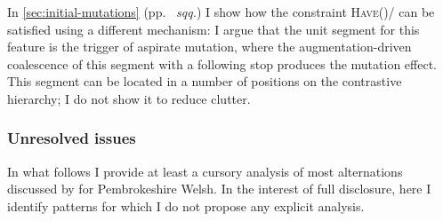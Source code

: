 In \cref{sec:initial-mutations} (pp.~ \emph{sqq.}) I show how the constraint \textsc{Have}()/ can be satisfied using a different mechanism: I argue that the unit segment for this feature is the trigger of aspirate mutation, where the augmentation\hyp driven coalescence of this segment with a following stop produces the mutation effect. This segment can be located in a number of positions on the contrastive hierarchy; I do not show it to reduce clutter.

\subsubsection{Unresolved issues}
\label{sec:unresolved-issues}

In what follows I provide at least a cursory analysis of most alternations discussed by \citet{awbery86:_pembr_welsh} for Pembrokeshire Welsh. In the interest of full disclosure, here I identify patterns for which I do not propose any explicit analysis.


